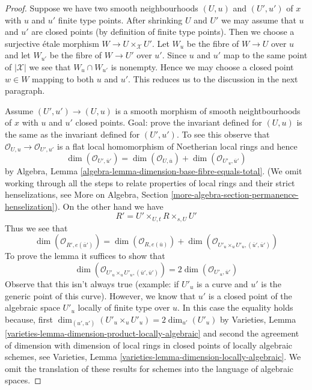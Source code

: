 \begin{proof}
Suppose we have two smooth neighbourhoods $(U, u)$ and $(U', u')$
of $x$ with $u$ and $u'$ finite type points. After shrinking $U$
and $U'$ we may assume that $u$ and $u'$ are closed points
(by definition of finite type points). Then we choose
a surjective \'etale morphism $W \to U \times_\mathcal{X} U'$.
Let $W_u$ be the fibre of $W \to U$ over $u$ and
let $W_{u'}$ be the fibre of $W \to U'$ over $u'$.
Since $u$ and $u'$ map to the same point of $|\mathcal{X}|$
we see that $W_u \cap W_{u'}$ is nonempty.
Hence we may choose a closed point $w \in W$ mapping to
both $u$ and $u'$. This reduces us to the discussion in the
next paragraph.

\medskip\noindent
Assume $(U', u') \to (U, u)$ is a smooth morphism of smooth
neightbourhoods of $x$ with $u$ and $u'$ closed points.
Goal: prove the invariant defined for $(U, u)$ is the same
as the invariant defined for $(U', u')$.
To see this observe that $\mathcal{O}_{U, u} \to \mathcal{O}_{U', u'}$
is a flat local homomorphism of Noetherian local rings and hence
$$
\dim(\mathcal{O}_{U', \overline{u}'}) =
\dim(\mathcal{O}_{U, \overline{u}}) +
\dim(\mathcal{O}_{U'_u, \overline{u}'})
$$
by Algebra, Lemma \ref{algebra-lemma-dimension-base-fibre-equals-total}.
(We omit working through all the steps to relate properties of local
rings and their strict henselizations, see
More on Algebra, Section \ref{more-algebra-section-permanence-henselization}).
On the other hand we have
$$
R' = U' \times_{U, t} R \times_{s, U} U'
$$
Thus we see that
$$
\dim(\mathcal{O}_{R', e(\overline{u}')}) =
\dim(\mathcal{O}_{R, e(\overline{u})}) +
\dim(\mathcal{O}_{U'_u \times_u U'_u, (\overline{u}', \overline{u}')})
$$
To prove the lemma it suffices to show that
$$
\dim(\mathcal{O}_{U'_u \times_u U'_u, (\overline{u}', \overline{u}')}) =
2\dim(\mathcal{O}_{U'_u, \overline{u}'})
$$
Observe that this isn't always true (example: if $U'_u$ is a curve
and $u'$ is the generic point of this curve). However, we know
that $u'$ is a closed point of the algebraic space $U'_u$ locally
of finite type over $u$. In this case the equality holds because, first
$\dim_{(u', u')}(U'_u \times_u U'_u) = 2\dim_{u'}(U'_u)$ by
Varieties, Lemma \ref{varieties-lemma-dimension-product-locally-algebraic}
and second the agreement of dimension with dimension of local rings
in closed points of locally algebraic schemes, see
Varieties, Lemma \ref{varieties-lemma-dimension-locally-algebraic}.
We omit the translation of these results for schemes into the
language of algebraic spaces.
\end{proof}

